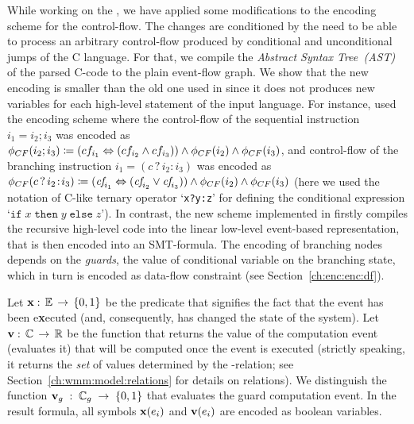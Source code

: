 While working on the \porthos[2], we have applied some modifications to the encoding scheme for the control-flow.
The changes are conditioned by the need to be able to process an arbitrary control-flow produced by conditional and unconditional jumps of the C language.
For that, we compile the \textit{Abstract Syntax Tree~(AST)} of the parsed C-code to the plain event-flow graph.
We show %
that the new encoding is smaller than the old one used in \porthos{} since it does not produces new variables for each high-level statement of the input language.
For instance, \porthos{} used the encoding scheme where the control-flow of the sequential instruction $i_1 = i_2; i_3$ was encoded as
$\phi_{CF}(i_2;i_3) \coloneqq (cf_{i_1} \Leftrightarrow (cf_{i_2} \land cf_{i_3})) \land \phi_{CF}(i_2) \land \phi_{CF}(i_3)$,
and control-flow of the branching instruction $i_1 = (c\,?\,i_2\!:\!i_3)$ was encoded as
$\phi_{CF}(c\,?\,i_2\!:\!i_3) \coloneqq (\textit{cf}_{i_1} \Leftrightarrow (\textit{cf}_{i_2} \lor \textit{cf}_{i_3})) \land \phi_{CF}(i_2) \land \phi_{CF}(i_3)$
(here we used the notation of C-like ternary operator `\texttt{x?y:z}' for defining the conditional expression `$\texttt{if}\;x\;\texttt{then}\;y\;\texttt{else}\;z$').
In contrast, the new scheme implemented in \porthos[2] firstly compiles the recursive high-level code into the linear low-level event-based representation, that is then encoded into an SMT-formula. The encoding of branching nodes depends on the \textit{guards}, the value of conditional variable on the branching state, which in turn is encoded as data-flow constraint (see Section~\ref{ch:enc:enc:df}).

Let $\mathbf{x}:\,\mathbb{E}\,\rightarrow\,\{0,1\}$ be the predicate that signifies the fact that the event has been e\textbf{x}ecuted (and, consequently, has changed the state of the system).
Let $\mathbf{v}:\,\mathbb{C}\,\rightarrow\,\mathbb{R}$ be the function that returns the value of the computation event (evaluates it) that will be computed once the event is executed (strictly speaking, it returns the \textit{set} of values determined by the \rf-relation; see Section~\ref{ch:wmm:model:relations} for details on relations).
We distinguish the function ${\mathbf{v}_g\;:\;\mathbb{C}_g\;\rightarrow\;\{0,1\}}$ that evaluates the guard computation event. In the result formula, all symbols $\mathbf{x}(e_i)$ and $\mathbf{v}(e_i)$ are encoded as boolean variables.

